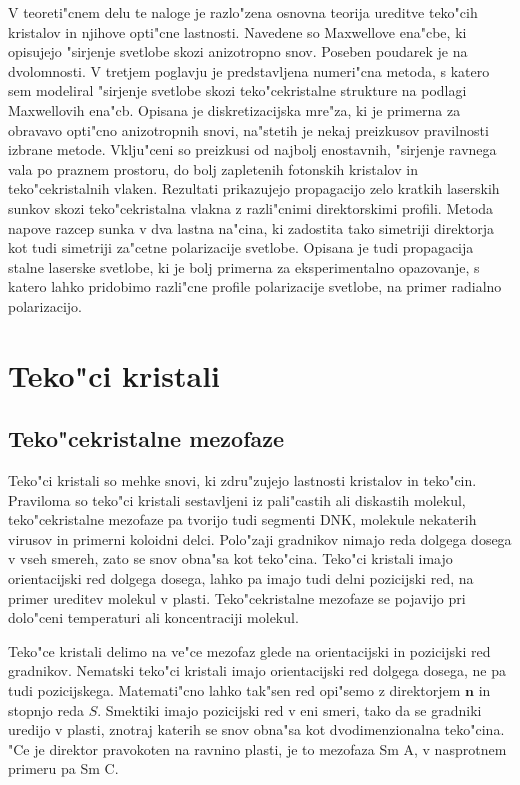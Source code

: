 \documentclass[12pt,twoside,openright,final]{report}
\begin{document}
V teoreti"cnem delu te naloge je razlo"zena osnovna teorija ureditve teko"cih kristalov in njihove opti"cne lastnosti. 
Navedene so Maxwellove ena"cbe, ki opisujejo "sirjenje svetlobe skozi anizotropno snov. 
Poseben poudarek je na dvolomnosti. 
V tretjem poglavju je predstavljena numeri"cna metoda, s katero sem modeliral "sirjenje svetlobe skozi teko"cekristalne strukture na podlagi Maxwellovih ena"cb. 
Opisana je diskretizacijska mre"za, ki je primerna za obravavo opti"cno anizotropnih snovi, na"stetih je nekaj preizkusov pravilnosti izbrane metode. 
Vklju"ceni so preizkusi od najbolj enostavnih, "sirjenje ravnega vala po praznem prostoru, do bolj zapletenih fotonskih kristalov in teko"cekristalnih vlaken. 
Rezultati prikazujejo propagacijo zelo kratkih laserskih sunkov skozi teko"cekristalna vlakna z razli"cnimi direktorskimi profili. 
Metoda napove razcep sunka v dva lastna na"cina, ki zadostita tako simetriji direktorja kot tudi simetriji za"cetne polarizacije svetlobe. 
Opisana je tudi propagacija stalne laserske svetlobe, ki je bolj primerna za eksperimentalno opazovanje, s katero lahko pridobimo razli"cne profile polarizacije svetlobe, na primer radialno polarizacijo. 


\chapter{Teko"ci kristali}

\section{Teko"cekristalne mezofaze}

Teko"ci kristali so mehke snovi, ki zdru"zujejo lastnosti kristalov in teko"cin\cite{degennes}. 
Praviloma so teko"ci kristali sestavljeni iz pali"castih ali diskastih molekul, teko"cekristalne mezofaze pa tvorijo tudi segmenti DNK, molekule nekaterih virusov in primerni koloidni delci. 
Polo"zaji gradnikov nimajo reda dolgega dosega v vseh smereh, zato se snov obna"sa kot teko"cina. 
Teko"ci kristali imajo orientacijski red dolgega dosega, lahko pa imajo tudi delni pozicijski red, na primer ureditev molekul v plasti. 
Teko"cekristalne mezofaze se pojavijo pri dolo"ceni temperaturi ali koncentraciji molekul. 

Teko"ce kristali delimo na ve"ce mezofaz glede na orientacijski in pozicijski red gradnikov. Nematski teko"ci kristali imajo orientacijski red dolgega dosega, ne pa tudi pozicijskega. 
Matemati"cno lahko tak"sen red opi"semo z direktorjem $\mathbf{n}$ in stopnjo reda $S$. 
Smektiki imajo pozicijski red v eni smeri, tako da se gradniki uredijo v plasti, znotraj katerih se snov obna"sa kot dvodimenzionalna teko"cina. 
"Ce je direktor pravokoten na ravnino plasti, je to mezofaza Sm A, v nasprotnem primeru pa Sm C. 
\end{document}
